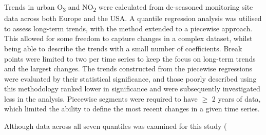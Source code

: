 \documentclass[journal abbreviation, manuscript]{copernicus}
\begin{document}
Trends in urban O\textsubscript{3} and NO\textsubscript{2} were calculated from de-seasoned monitoring site data across both Europe and the USA. A quantile regression analysis was utilised to assess long-term trends, with the method extended to a piecewise approach. This allowed for some freedom to capture changes in a complex dataset, whilst being able to describe the trends with a small number of coefficients. Break points were limited to two per time series to keep the focus on long-term trends and the largest changes. The trends constructed from the piecewise regressions were evaluated by their statistical significance, and those poorly described using this methodology ranked lower in significance and were subsequently investigated less in the analysis. Piecewise segments were required to have $\ge$ 2 years of data, which limited the ability to define the most recent changes in a given time series.

Although data across all seven quantiles was examined for this study (

\end{document}
